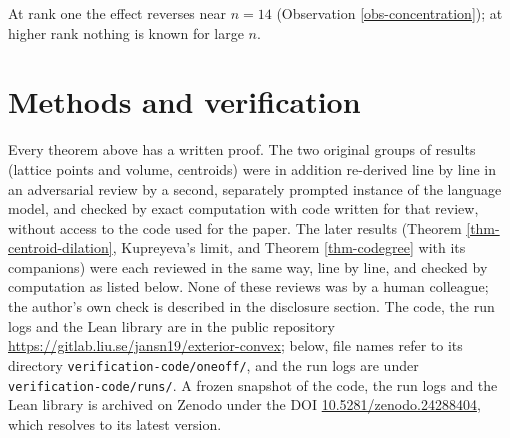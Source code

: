 \documentclass[11pt, a4paper, abstract=yes]{scrartcl}
\theoremstyle{definition}
\theoremstyle{remark}
\theoremstyle{plain}
\theoremstyle{remark}
\theoremstyle{plain}
\let\autocite\cite
\begin{document}
At rank one the effect reverses near \(n=14\) (Observation \ref{obs-concentration}); at higher rank
nothing is known for large \(n\).
\section{Methods and verification}
\label{sec-methods}
Every theorem above has a written proof. The two original groups of results (lattice points and
volume, centroids) were in addition re-derived line by line in an adversarial review by a second,
separately prompted instance of the language model, and checked by exact computation with code
written for that review, without access to the code used for the paper. The later results
(Theorem \ref{thm-centroid-dilation}, Kupreyeva's limit, and Theorem \ref{thm-codegree} with its
companions) were each reviewed in the same way, line by line, and checked by computation as listed
below. None of these reviews was by a human colleague; the author's own check is described in the
disclosure section. The code, the run logs and the Lean library are in the public repository
\url{https://gitlab.liu.se/jansn19/exterior-convex}; below, file names refer to its directory
\texttt{verification-code/oneoff/}, and the run logs are under \texttt{verification-code/runs/}. A frozen snapshot of the code, the run logs and the Lean library is archived on Zenodo
\autocite{SnellmanZenodoSeries} under the DOI
\href{https://doi.org/10.5281/zenodo.24288404}{10.5281/zenodo.24288404}, which resolves to its latest version.

\begingroup\sloppy
\end{document}
